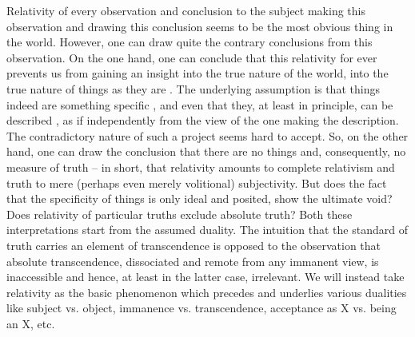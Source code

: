 {Relativity of every observation and conclusion to the
  subject making this observation and drawing this conclusion seems to be the
  most obvious thing in the world. However, one can draw quite the contrary
  conclusions from this observation. On the one hand, one can conclude that this
  relativity for ever prevents us from gaining an insight into the true nature
  of the world, into the true nature of things as they are .
  The underlying assumption is that things indeed are something specific , and even that they, at least in principle, can be described
  , as if independently from the view of the one making the
  description. The contradictory nature of such a project seems hard to accept.
  So, on the other hand, one can draw the conclusion that there are no things
   and, consequently, no measure of truth -- in short, that
  relativity amounts to complete relativism and truth to mere (perhaps even
  merely volitional) subjectivity. But does the fact that the specificity of
  things  is only ideal and posited, show the ultimate void?
  Does relativity of particular truths exclude absolute truth? 
Both these interpretations start from the assumed duality. The
intuition that the standard of truth carries an element of transcendence is
opposed to the observation that absolute transcendence, dissociated and remote
from any immanent view, is inaccessible and hence, at least in the latter case,
irrelevant. We will instead take relativity as the basic phenomenon which
  precedes and underlies various dualities like subject vs. object,
  immanence vs. transcendence, acceptance as X vs. being an X, etc.}



